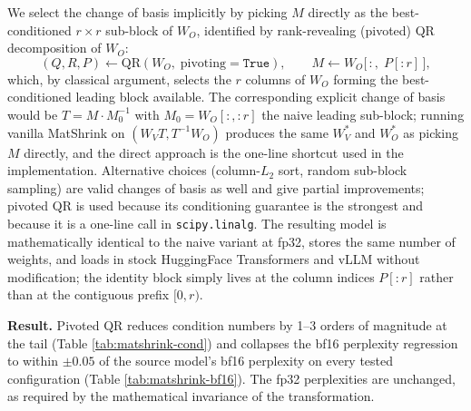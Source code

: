 \documentclass{article}
\begin{document}
We select the change of basis implicitly by picking $M$ directly as the best-conditioned $r \times r$ sub-block of $W_O$, identified by rank-revealing (pivoted) QR decomposition of $W_O$:
\begin{equation*}
    (Q, R, P) \gets \mathrm{QR}(W_O,\; \text{pivoting}=\mathtt{True}), \qquad M \gets W_O\bigl[\,:,\; P[:r]\,\bigr],
\end{equation*}
which, by classical argument, selects the $r$ columns of $W_O$ forming the best-conditioned leading block available. The corresponding explicit change of basis would be $T = M \cdot M_0^{-1}$ with $M_0 = W_O[:,:r]$ the naive leading sub-block; running vanilla MatShrink on $(W_V T, T^{-1} W_O)$ produces the same $W_V^\ast$ and $W_O^\ast$ as picking $M$ directly, and the direct approach is the one-line shortcut used in the implementation. Alternative choices (column-$L_2$ sort, random sub-block sampling) are valid changes of basis as well and give partial improvements; pivoted QR is used because its conditioning guarantee is the strongest and because it is a one-line call in \texttt{scipy.linalg}. The resulting model is mathematically identical to the naive variant at fp32, stores the same number of weights, and loads in stock HuggingFace Transformers and vLLM without modification; the identity block simply lives at the column indices $P[:r]$ rather than at the contiguous prefix $[0, r)$.

\textbf{Result.} Pivoted QR reduces condition numbers by 1--3 orders of magnitude at the tail (Table \ref{tab:matshrink-cond}) and collapses the bf16 perplexity regression to within $\pm 0.05$ of the source model's bf16 perplexity on every tested configuration (Table \ref{tab:matshrink-bf16}). The fp32 perplexities are unchanged, as required by the mathematical invariance of the transformation.
\end{document}
